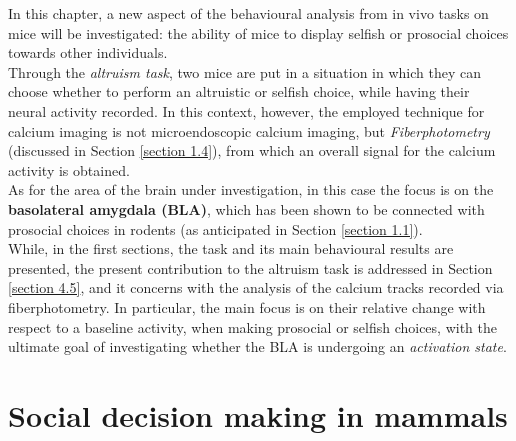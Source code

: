 \documentclass[12pt, a4paper]{report}
\begin{document}
In this chapter, a new aspect of the behavioural analysis from in vivo tasks on mice will be investigated: the ability of mice to display selfish or prosocial choices towards other individuals.\\
Through the \textit{altruism task}, two mice are put in a situation in which they can choose whether to perform an altruistic or selfish choice, while having their neural activity recorded. In this context, however, the employed technique for calcium imaging is not microendoscopic calcium imaging, but \textit{Fiberphotometry} (discussed in Section \ref{section 1.4}), from which an overall signal for the calcium activity is obtained.\\
As for the area of the brain under investigation, in this case the focus is on the \textbf{basolateral amygdala (BLA)}, which has been shown to be connected with prosocial choices in rodents (as anticipated in Section \ref{section 1.1}).\\
While, in the first sections, the task and its main behavioural results are presented, the present contribution to the altruism task is addressed in Section \ref{section 4.5}, and it concerns with the analysis of the calcium tracks recorded via fiberphotometry. In particular, the main focus is on their relative change with respect to a baseline activity, when making prosocial or selfish choices, with the ultimate goal of investigating whether the BLA is undergoing an \textit{activation state}.


 


\section{Social decision making in mammals}
\end{document}
